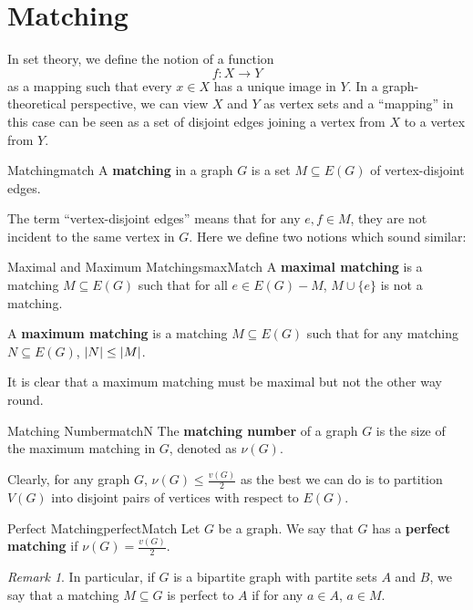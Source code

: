\documentclass[math, code]{amznotes}
\theoremstyle{remark}
\newtheorem*{remark}{Remark}
\begin{document}
\section{Matching}
In set theory, we define the notion of a function
\begin{equation*}
    f \colon X \to Y
\end{equation*}
as a mapping such that every $x \in X$ has a unique image in $Y$. In a graph-theoretical perspective, we can view $X$ and $Y$ as vertex sets and a ``mapping'' in this case can be seen as a set of disjoint edges joining a vertex from $X$ to a vertex from $Y$.
\begin{dfnbox}{Matching}{match}
    A {\color{red} \textbf{matching}} in a graph $G$ is a set $M \subseteq E(G)$ of vertex-disjoint edges.
\end{dfnbox}
The term ``vertex-disjoint edges'' means that for any $e, f \in M$, they are not incident to the same vertex in $G$. Here we define two notions which sound similar:
\begin{dfnbox}{Maximal and Maximum Matchings}{maxMatch}
    A {\color{red} \textbf{maximal matching}} is a matching $M \subseteq E(G)$ such that for all $e \in E(G) - M$, $M \cup \{e\}$ is not a matching.

    A {\color{red} \textbf{maximum matching}} is a matching $M \subseteq E(G)$ such that for any matching $N \subseteq E(G)$, ${\left\lvert {N} \right\rvert} \leq {\left\lvert {M} \right\rvert}$.
\end{dfnbox}
It is clear that a maximum matching must be maximal but not the other way round.
\begin{dfnbox}{Matching Number}{matchN}
    The {\color{red} \textbf{matching number}} of a graph $G$ is the size of the maximum matching in $G$, denoted as $\nu(G)$.
\end{dfnbox}
Clearly, for any graph $G$, $\nu(G) \leq \frac{v(G)}{2}$ as the best we can do is to partition $V(G)$ into disjoint pairs of vertices with respect to $E(G)$.
\begin{dfnbox}{Perfect Matching}{perfectMatch}
    Let $G$ be a graph. We say that $G$ has a {\color{red} \textbf{perfect matching}} if $\nu(G) = \frac{v(G)}{2}$.
\end{dfnbox}
\begin{notebox}
    \begin{remark}
        In particular, if $G$ is a bipartite graph with partite sets $A$ and $B$, we say that a matching $M \subseteq G$ is perfect to $A$ if for any $a \in A$, $a \in M$.
    \end{remark}
\end{notebox}
\end{document}
